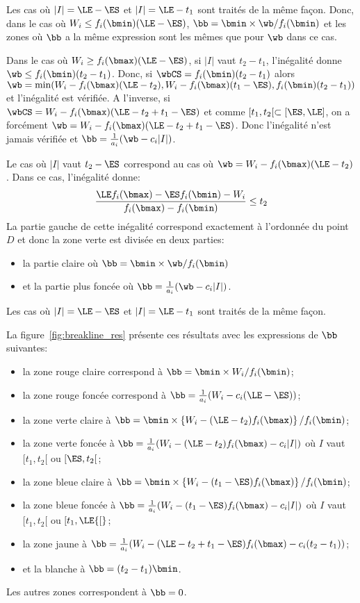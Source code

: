 Les cas où $|I| = \LE -\ES$ et $|I| =
\LE -t_1$ sont traités de la même façon. Donc, dans le cas où $W_i \le
f_i(\bmin) (\LE - \ES)$, $\bb=\bmin \times \wb/f_i(\bmin)$ et les
zones où $\bb$ a la même expression sont les mêmes que pour $\wb$ dans
ce cas. 

Dans le cas où $W_i \ge f_i(\bmax)(\LE - \ES)$, si $|I|$ vaut
$t_2-t_1$, l'inégalité donne $\wb \le f_i(\bmin)(t_2-t_1)$. Donc, si
$\wbCS=f_i(\bmin) (t_2-t_1)$ alors $\wb=\min(W_i -
f_i(\bmax)(\LE-t_2), W_i - f_i(\bmax)(t_1-\ES),
f_i(\bmin)(t_2-t_1))$ et l'inégalité est vérifiée. A l'inverse, si
$\wbCS=W_i - f_i(\bmax)(\LE - t_2 +t_1 - \ES)$ et comme $[t_1,t_2[
\subset [\ES,\LE]$, on a forcément $\wb=W_i - f_i(\bmax)(\LE - t_2
+t_1 - \ES)$. Donc l'inégalité n'est jamais vérifiée et
$\bb=\frac{1}{a_i}(\wb-c_i|I|)$. 

Le cas où $|I|$ vaut $t_2 - \ES$ correspond au cas où
$\wb=W_i-f_i(\bmax)(\LE-t_2)$. Dans ce cas, l'inégalité donne: 
\[ \frac{\LE f_i(\bmax) - \ES f_i(\bmin) - W_i}{f_i(\bmax)-f_i(\bmin)}
  \le t_2 \]
La partie gauche de cette inégalité correspond exactement à l'ordonnée
du point $D$ et donc la zone verte est divisée en deux parties:
\begin{itemize}
\item la partie claire où $\bb= \bmin \times \wb / f_i(\bmin)$
\item  et la partie plus foncée où $\bb=\frac{1}{a_i}(\wb - c_i|I|)$.
\end{itemize}
Les cas où $|I| = \LE -\ES$ et $|I| = \LE -t_1$ sont traités de la
même façon.

La figure~\ref{fig:breakline_res} présente ces résultats avec les
 expressions de $\bb$ suivantes:
 \begin{itemize}
 \item la zone rouge claire correspond à $\bb=\bmin \times W_i/f_i(\bmin)$;
 \item la zone rouge foncée correspond à $\bb=\frac{1}{a_i}(W_i - c_i (\LE - \ES))$;
 \item la zone verte claire à $\bb=\bmin \times
   \left\{W_i-(\LE-t_2)f_i(\bmax)\right\}/ f_i(\bmin)$;
 \item la zone verte foncée à
   $\bb=\frac{1}{a_i}(W_i-(\LE-t_2)f_i(\bmax) - c_i |I|)$ où $I$ vaut
   $[t_1,t_2[$ ou $[\ES,t_2[$;
 \item la zone bleue claire à $\bb=\bmin \times \left\{W_i-(t_1-\ES)f_i(\bmax)\right\}/f_i(\bmin)$;
 \item la zone bleue foncée à $\bb=\frac{1}{a_i}(W_i-(t_1-\ES)f_i(\bmax) - c_i
   |I|)$ où $I$ vaut  $[t_1,t_2[$ ou $[t_1,\LE{[}$;
 \item la zone jaune à
   $\bb=\frac{1}{a_i}(W_i-(\LE-t_2+t_1-\ES)f_i(\bmax) - c_i (t_2 - t_1))$;
 \item et la blanche à $\bb=(t_2-t_1) \bmin$.
 \end{itemize}
 Les autres zones correspondent à $\bb=0$.

